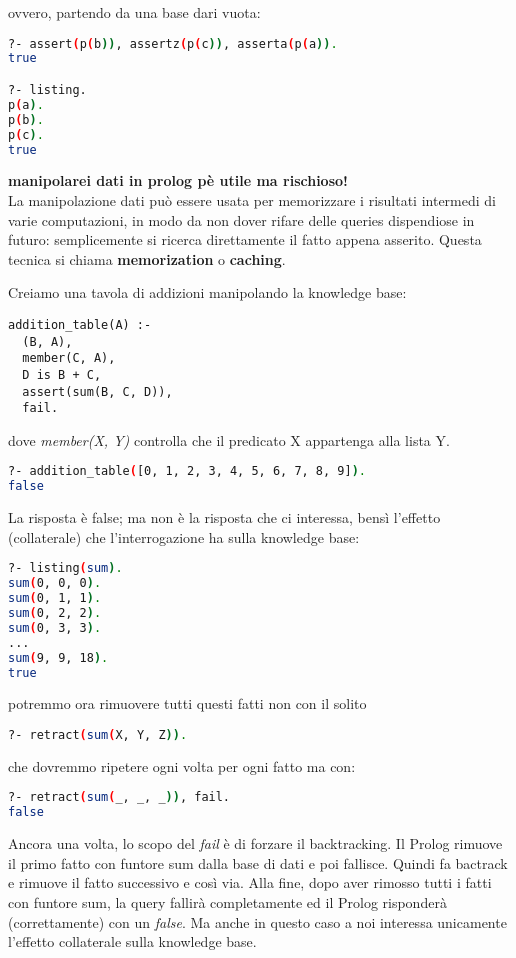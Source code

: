 \documentclass[a4paper,12pt, oneside]{book}
\begin{document}
ovvero, partendo da una base dari vuota:
\begin{shaded}
\begin{lstlisting}[language=bash]
?- assert(p(b)), assertz(p(c)), asserta(p(a)).
true

?- listing.
p(a).
p(b).
p(c).
true
\end{lstlisting}
\end{shaded}
\textbf{manipolarei dati in prolog pè utile ma rischioso!}\\
La manipolazione dati può essere usata per memorizzare i risultati
intermedi di varie computazioni, in modo da non dover rifare
delle queries dispendiose in futuro: semplicemente si ricerca
direttamente il fatto appena asserito. Questa tecnica si chiama \textbf{memorization} o \textbf{caching}.
\begin{esempio}
Creiamo una tavola di addizioni manipolando la knowledge base:
\begin{verbatim}
addition_table(A) :-
  (B, A),
  member(C, A),
  D is B + C,
  assert(sum(B, C, D)),
  fail.
\end{verbatim}
dove \textit{member(X, Y)} controlla che il predicato X appartenga alla lista Y.\\
\begin{shaded}
\begin{lstlisting}[language=bash]
?- addition_table([0, 1, 2, 3, 4, 5, 6, 7, 8, 9]).
false
\end{lstlisting}
\end{shaded}
La risposta è false; ma non è la risposta che ci interessa, bensì
l'effetto (collaterale) che l'interrogazione ha sulla knowledge base:
\begin{shaded}
\begin{lstlisting}[language=bash]
?- listing(sum).
sum(0, 0, 0).
sum(0, 1, 1).
sum(0, 2, 2).
sum(0, 3, 3).
...
sum(9, 9, 18).
true
\end{lstlisting}
\end{shaded}
potremmo ora rimuovere tutti questi fatti non con il solito 
\begin{shaded}
\begin{lstlisting}[language=bash]
?- retract(sum(X, Y, Z)).
\end{lstlisting}
\end{shaded}
che dovremmo ripetere ogni volta per ogni fatto ma con:
\begin{shaded}
\begin{lstlisting}[language=bash]
?- retract(sum(_, _, _)), fail.
false
\end{lstlisting}
\end{shaded}
Ancora una volta, lo scopo del \textit{fail} è di forzare il backtracking. Il Prolog rimuove il primo fatto con funtore sum dalla base di dati e poi fallisce. Quindi fa bactrack e rimuove il fatto successivo e così via. Alla fine, dopo aver rimosso tutti i fatti con funtore sum, la query fallirà completamente ed il Prolog risponderà (correttamente) con un \textit{false}. Ma anche in questo caso a noi interessa unicamente l'effetto collaterale sulla knowledge base.
\end{esempio}
\end{document}
